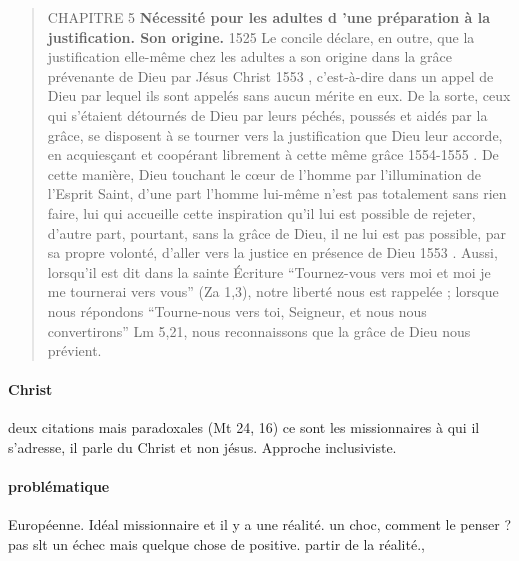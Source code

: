 \begin{quote}
    CHAPITRE 5
\textbf{Nécessité pour les adultes d 'une préparation à la justification. Son origine. }
1525 Le concile déclare, en outre, que la justification elle-même chez les adultes a son origine dans la grâce prévenante de Dieu par Jésus Christ 1553 , c'est-à-dire dans un appel de Dieu par lequel ils sont appelés sans aucun mérite en eux. De la sorte, ceux qui s'étaient détournés de Dieu par leurs péchés, poussés et aidés par la grâce, se disposent à se tourner vers la justification que Dieu leur accorde, en acquiesçant et coopérant librement à cette même grâce 1554-1555 . De cette manière, Dieu touchant le cœur de l'homme par l'illumination de l'Esprit Saint, d'une part l'homme lui-même n'est pas totalement sans rien faire, lui qui accueille cette inspiration qu'il lui est possible de rejeter, d'autre part, pourtant, sans la grâce de Dieu, il ne lui est pas possible, par sa propre volonté, d'aller vers la justice en présence de Dieu 1553 . Aussi, lorsqu'il est dit dans la sainte Écriture   “Tournez-vous vers moi et moi je me tournerai vers vous” (Za 1,3), notre liberté nous est rappelée ; lorsque nous répondons “Tourne-nous vers toi, Seigneur, et nous nous convertirons” Lm 5,21, nous reconnaissons que la grâce de Dieu nous prévient.
\end{quote}

\paragraph{Christ} deux citations mais paradoxales (Mt 24, 16)   ce sont les missionnaires à qui il s'adresse, il parle du Christ et non jésus.  Approche inclusiviste. 

\paragraph{problématique} Européenne. Idéal missionnaire et il y a une réalité. un choc, comment le penser ? pas slt un échec mais quelque chose de positive. partir de la réalité., 


